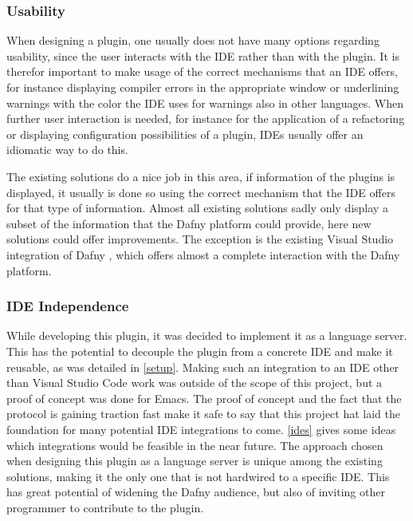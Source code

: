 \subsubsection{Usability}
When designing a plugin, one usually does not have many options regarding usability, since the user interacts with the IDE rather than with the plugin. It is therefor important to make usage of the correct mechanisms that an IDE offers, for instance displaying compiler errors in the appropriate window or underlining warnings with the color the IDE uses for warnings also in other languages. When further user interaction is needed, for instance for the application of a refactoring or displaying configuration possibilities of a plugin, IDEs usually offer an idiomatic way to do this.  \newline

The existing solutions do a nice job in this area, if information of the plugins is displayed, it usually is done so using the correct mechanism that the IDE offers for that type of information. Almost all existing solutions sadly only display a subset of the information that the Dafny platform could provide, here new solutions could offer improvements. The exception is the existing Visual Studio integration of Dafny \cite{visualstudiodafny}, which offers almost a complete interaction with the Dafny platform. 
\newline

\subsubsection{IDE Independence}
While developing this plugin, it was decided to implement it as a language server. This has the potential to decouple the plugin from a concrete IDE and make it reusable, as was detailed in \ref{setup}. Making such an integration to an IDE other than Visual Studio Code work was outside of the scope of this project, but a proof of concept was done for Emacs. \newline
The proof of concept and the fact that the protocol is gaining traction fast make it safe to say that this project hat laid the foundation for many potential IDE integrations to come. \ref{ides} gives some ideas which integrations would be feasible in the near future. \newline
The approach chosen when designing this plugin as a language server is unique among the existing solutions, making it the only one that is not hardwired to a specific IDE. This has great potential of widening the Dafny audience, but also of inviting other programmer to contribute to the plugin.

